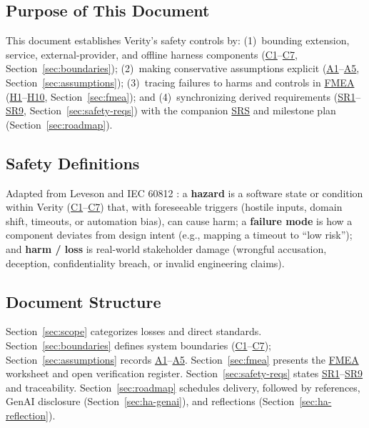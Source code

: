 \documentclass[11pt]{article}
\newcommand{\FMEA}{\hyperlink{ha-acr-fmea}{FMEA}}
\newcommand{\SRS}{\hyperlink{ha-acr-srs}{SRS}}
\begin{document}
\subsection{Purpose of This Document}
This document establishes Verity's safety controls by: (1)~bounding extension, service, external-provider, and offline harness components (\hyperref[comp:C1]{C1}--\hyperref[comp:C7]{C7}, Section~\ref{sec:boundaries}); (2)~making conservative assumptions explicit (\hyperref[assump:A1]{A1}--\hyperref[assump:A5]{A5}, Section~\ref{sec:assumptions}); (3)~tracing failures to harms and controls in \FMEA{} (\hyperref[haz:H1]{H1}--\hyperref[haz:H10]{H10}, Section~\ref{sec:fmea}); and (4)~synchronizing derived requirements (\hyperref[SR1]{SR1}--\hyperref[SR9]{SR9}, Section~\ref{sec:safety-reqs}) with the companion \SRS{} \cite{VeritySRS2026} and milestone plan (Section~\ref{sec:roadmap}).

\subsection{Safety Definitions}\label{subsec:hazard-def}
Adapted from Leveson \cite{Leveson2011} and IEC 60812 \cite{IEC60812}: a \textbf{hazard} is a software state or condition within Verity (\hyperref[comp:C1]{C1}--\hyperref[comp:C7]{C7}) that, with foreseeable triggers (hostile inputs, domain shift, timeouts, or automation bias), can cause harm; a \textbf{failure mode} is how a component deviates from design intent (e.g., mapping a timeout to ``low risk''); and \textbf{harm / loss} is real-world stakeholder damage (wrongful accusation, deception, confidentiality breach, or invalid engineering claims).

\subsection{Document Structure}
Section~\ref{sec:scope} categorizes losses and direct standards. Section~\ref{sec:boundaries} defines system boundaries (\hyperref[comp:C1]{C1}--\hyperref[comp:C7]{C7}); Section~\ref{sec:assumptions} records \hyperref[assump:A1]{A1}--\hyperref[assump:A5]{A5}. Section~\ref{sec:fmea} presents the \FMEA{} worksheet and open verification register. Section~\ref{sec:safety-reqs} states \hyperref[SR1]{SR1}--\hyperref[SR9]{SR9} and traceability. Section~\ref{sec:roadmap} schedules delivery, followed by references, GenAI disclosure (Section~\ref{sec:ha-genai}), and reflections (Section~\ref{sec:ha-reflection}).

\end{document}
